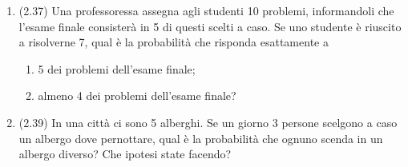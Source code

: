 \begin{enumerate}
    \item (2.37) Una professoressa assegna agli studenti 10 problemi, informandoli che l'esame finale consister\`a in 5 di questi scelti a caso. Se uno studente \`e riuscito a risolverne 7, qual \`e la probabilit\`a che risponda esattamente a
    \begin{enumerate}
        \item 5 dei problemi dell'esame finale;
        \item almeno 4 dei problemi dell'esame finale?
    \end{enumerate}
    \item (2.39) In una citt\`a ci sono 5 alberghi. Se un giorno 3 persone scelgono a caso un albergo dove pernottare, qual \`e la probabilit\`a che ognuno scenda in un albergo diverso? Che ipotesi state facendo?
\end{enumerate}